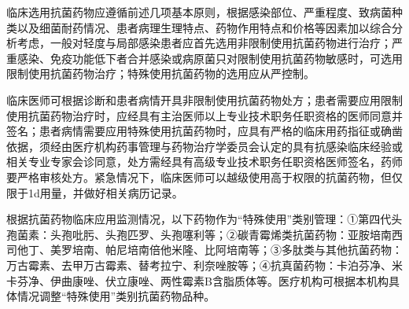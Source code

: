 临床选用抗菌药物应遵循前述几项基本原则，根据感染部位、严重程度、致病菌种类以及细菌耐药情况、患者病理生理特点、药物作用特点和价格等因素加以综合分析考虑，一般对轻度与局部感染患者应首先选用非限制使用抗菌药物进行治疗；严重感染、免疫功能低下者合并感染或病原菌只对限制使用抗菌药物敏感时，可选用限制使用抗菌药物治疗；特殊使用抗菌药物的选用应从严控制。

临床医师可根据诊断和患者病情开具非限制使用抗菌药物处方；患者需要应用限制使用抗菌药物治疗时，应经具有主治医师以上专业技术职务任职资格的医师同意并签名；患者病情需要应用特殊使用抗菌药物时，应具有严格的临床用药指征或确凿依据，须经由医疗机构药事管理与药物治疗学委员会认定的具有抗感染临床经验或相关专业专家会诊同意，处方需经具有高级专业技术职务任职资格医师签名，药师要严格审核处方。紧急情况下，临床医师可以越级使用高于权限的抗菌药物，但仅限于1d用量，并做好相关病历记录。

根据抗菌药物临床应用监测情况，以下药物作为“特殊使用”类别管理：①第四代头孢菌素：头孢吡肟、头孢匹罗、头孢噻利等；②碳青霉烯类抗菌药物：亚胺培南西司他丁、美罗培南、帕尼培南倍他米隆、比阿培南等；③多肽类与其他抗菌药物：万古霉素、去甲万古霉素、替考拉宁、利奈唑胺等；④抗真菌药物：卡泊芬净、米卡芬净、伊曲康唑、伏立康唑、两性霉素B含脂质体等。医疗机构可根据本机构具体情况调整“特殊使用”类别抗菌药物品种。